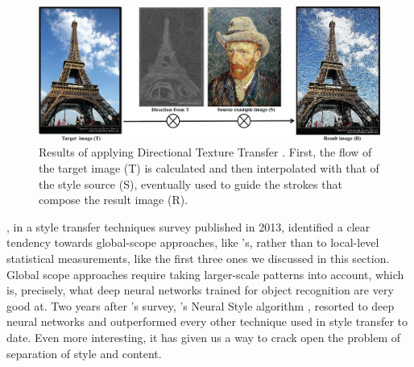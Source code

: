 \begin{figure}[t]
  \includegraphics[width=\textwidth]{gfx/style-transfer-directional}
  \caption{
    Results of applying Directional Texture Transfer \cite{Lee2010}.
    First, the flow of the target image (T) is calculated and then interpolated with that of the style source (S), eventually used to guide the strokes that compose the result image (R).
  }
  \label{fig:sec:context:style-transfer:style-transfer-directional}
\end{figure}

\citeauthor{Kyprianidis2013}, in a style transfer techniques survey \cite{Kyprianidis2013} published in 2013, identified a clear tendency towards global-scope approaches, like \citeauthor{Lee2010}'s, rather than to local-level statistical measurements, like the first three ones we discussed in this section.
Global scope approaches require taking larger-scale patterns into account, which is, precisely, what deep neural networks trained for object recognition are very good at.
Two years after \citeauthor{Kyprianidis2013}'s survey, \citeauthor{Gatys2015B}'s Neural Style algorithm \cite{Gatys2015B}, resorted to deep neural networks and outperformed every other technique used in style transfer to date.
Even more interesting, it has given us a way to crack open the problem of separation of style and content.
